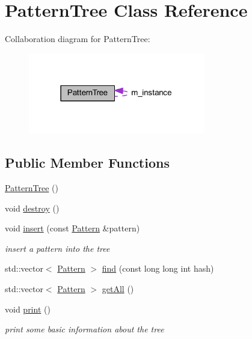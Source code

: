 \hypertarget{class_pattern_tree}{}\section{PatternTree Class Reference}
\label{class_pattern_tree}


Collaboration diagram for PatternTree:
\nopagebreak
\begin{figure}[H]
\begin{center}
\leavevmode
\includegraphics[width=219pt]{class_pattern_tree__coll__graph}
\end{center}
\end{figure}
\subsection*{Public Member Functions}
\begin{DoxyCompactItemize}
\item 
\hyperlink{class_pattern_tree_a8c393d9dc7966220803f670062d81cb5}{PatternTree} ()
\item 
void \hyperlink{class_pattern_tree_aeedfa28c34ce69dc494675e9662bd60b}{destroy} ()
\item 
void \hyperlink{class_pattern_tree_af698c6d454803b5debff21fe19eecab5}{insert} (const \hyperlink{class_pattern}{Pattern} \&pattern)
\begin{DoxyCompactList}\small\item\em insert a pattern into the tree \end{DoxyCompactList}\item 
std::vector$<$ \hyperlink{class_pattern}{Pattern} $>$ \hyperlink{class_pattern_tree_a86ae88dfb3fd379e2b914590b5a2f896}{find} (const long long int hash)
\item 
std::vector$<$ \hyperlink{class_pattern}{Pattern} $>$ \hyperlink{class_pattern_tree_a01a7afad6ad98b8d5958096c54c45b1f}{getAll} ()
\item 
void \hyperlink{class_pattern_tree_a4db45bd0a698e9999c743f5ac05c33a6}{print} ()
\begin{DoxyCompactList}\small\item\em print some basic information about the tree \end{DoxyCompactList}\end{DoxyCompactItemize}
